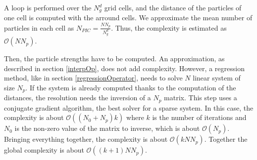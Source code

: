 A loop is performed over the $N_g^d$ grid cells, and the distance of the particles of one cell is computed with the arround cells. We approximate the mean number of particles in each cell as $N_{PIC} = \frac{NN_p}{N_g^d}$. Thus, the complexity is estimated as $\mathcal{O}(NN_p)$.

Then, the particle strengths have to be computed. An approximation, as described in section \ref{interpOp}, does not add complexity. However, a regression method, like in section \ref{regressionOperator}, needs to solve $N$ linear system of size $N_p$. If the system is already computed thanks to the computation of the distances, the resolution needs the inversion of a $N_p$ matrix. This step uses a conjugate gradient algorithm, the best solver for a sparse system. In this case, the complexity is about $\mathcal{O}((N_0 + N_p) k)$ where $k$ is the number of iterations and $N_0$ is the non-zero value of the matrix to inverse, which is about $\mathcal{O}(N_p)$. Bringing everything together, the complexity is about $\mathcal{O}(kNN_p)$. Together the global complexity is about $\mathcal{O}((k+1)NN_p)$.